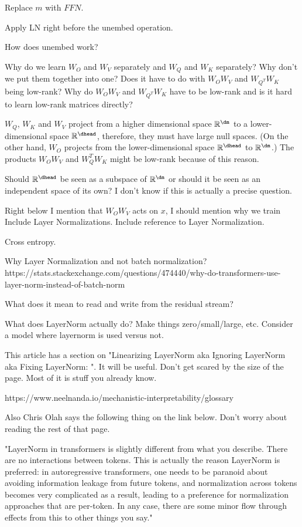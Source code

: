 Replace $m$ with $FFN$. 

Apply LN right before the unembed operation. 

How does unembed work? 

Why do we learn $W_O$ and $W_V$ separately and $W_Q$ and $W_K$ separately? Why don't we put them together into one? Does it have to do with $W_O W_V$ and $W_{Q^T} W_K$ being low-rank? Why do $W_O W_V$ and $W_{Q^T} W_K$ have to be low-rank and is it hard to learn low-rank matrices directly? 

$W_Q$, $W_K$ and $W_V$ project from a higher dimensional space $\R^\dm$ to a lower-dimensional space $\R^\dhead$, therefore, they must have large null spaces. (On the other hand, $W_O$ projects from the lower-dimensional space $\R^\dhead$ to $\R^\dm$.) The products $W_O W_V$ and  $W_Q^T W_K$ might be low-rank because of this reason.

Should $\R^{\dhead}$ be seen as a subspace of $\R^{\dm}$ or should it be seen as an independent space of its own? I don't know if this is actually a precise question. 

Right below I mention that $W_O W_V$ acts on $x$, I should mention why we train 
Include Layer Normalizations. 
Include reference to Layer Normalization. 

Cross entropy.

Why Layer Normalization and not batch normalization? https://stats.stackexchange.com/questions/474440/why-do-transformers-use-layer-norm-instead-of-batch-norm

What does it mean to read and write from the residual stream? 

What does LayerNorm actually do? Make things zero/small/large, etc. Consider a model where layernorm is used versus not. 

This article has a section on "Linearizing LayerNorm aka Ignoring LayerNorm aka Fixing LayerNorm: ". It will be useful. Don't get scared by the size of the page. Most of it is stuff you already know.

https://www.neelnanda.io/mechanistic-interpretability/glossary

Also Chris Olah says the following thing on the link below. Don't worry about reading the rest of that page.

"LayerNorm in transformers is slightly different from what you describe. There are no interactions between tokens. This is actually the reason LayerNorm is preferred: in autoregressive transformers, one needs to be paranoid about avoiding information leakage from future tokens, and normalization across tokens becomes very complicated as a result, leading to a preference for normalization approaches that are per-token. In any case, there are some minor flow through effects from this to other things you say."

